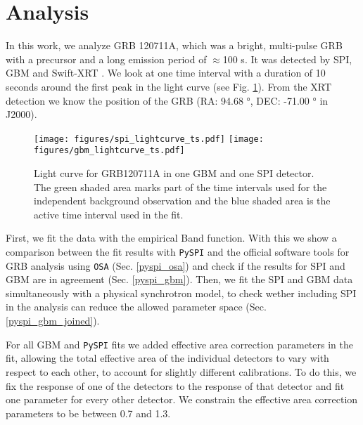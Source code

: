 \documentclass[twocolumn,traditabstract]{aa}
\begin{document}
\section{Analysis}
\label{analysis}
In this work, we analyze GRB 120711A, which was a bright, multi-pulse GRB with a precursor and a long emission period of $\approx$100 s. It was detected by SPI, GBM and Swift-XRT \citep{GCN_integral, GCN_gbm, GCN_swift}. We look at one time interval with a duration of 10 seconds around the first peak in the light curve (see Fig. \ref{fig:time_selection}). From the XRT detection we know the position of the GRB (RA: 94.68 °, DEC: -71.00 ° in J2000).

\begin{figure}
  \begin{centering}
    \texttt{[image: figures/spi\_lightcurve\_ts.pdf]}
    \texttt{[image: figures/gbm\_lightcurve\_ts.pdf]}
    \caption{Light curve for GRB120711A in one GBM and one SPI detector. The green shaded area marks part of the time intervals used for the independent background observation and the blue shaded area is the active time interval used in the fit.}
    \label{fig:time_selection}
  \end{centering}
\end{figure}

First, we fit the data with the empirical Band function. With this we show a comparison between the fit results with {\tt PySPI} and the official software tools for GRB analysis using {\tt OSA} (Sec. \ref{pyspi_osa}) and check if the results for SPI and GBM are in agreement (Sec. \ref{pyspi_gbm}). Then, we fit the SPI and GBM data simultaneously with a physical synchrotron model, to check wether including SPI in the analysis can reduce the allowed parameter space (Sec. \ref{pyspi_gbm_joined}).

For all GBM and {\tt PySPI} fits we added effective area correction parameters in the fit, allowing the total effective area of the individual detectors to vary with respect to each other, to account for slightly different calibrations. To do this, we fix the response of one of the detectors to the response of that detector and fit one parameter for every other detector. We constrain the effective area correction parameters to be between 0.7 and 1.3.
\end{document}
